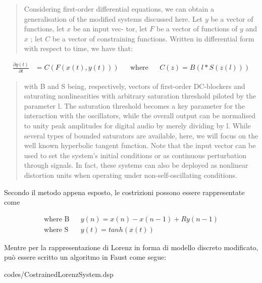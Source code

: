 \begin{quote}
    Considering first-order differential equations, 
    we can obtain a generalisation of the modified systems discussed
    here. Let \( y \) be a vector of functions, let \( x \) be an input vec-
    tor, let \( F \) be a vector of functions of \( y \) and \( x \) ; let  \( C \) be
    a vector of constraining functions. Written in differential
    form with respect to time, we have that:
\end{quote}
\begin{center}
\begin{align*}
    \frac{\partial y(t)}{\partial t} & = C(F(x(t), y(t))) && \text{where} && C(z) = B(l * S(z(l)))
\end{align*}
\end{center}
\begin{quote}
    with B and S being, respectively, vectors of first-order
    DC-blockers and saturating nonlinearities with arbitrary
    saturation threshold piloted by the parameter l. The saturation threshold 
    becomes a key parameter for the interaction with the oscillators, while the overall output can be
    normalised to unity peak amplitudes for digital audio by
    merely dividing by l. While several types of bounded saturators are available, here, 
    we will focus on the well known 
    hyperbolic tangent function. Note that the input
    vector can be used to set the system’s initial conditions or
    as continuous perturbation through signals. In fact, these
    systems can also be deployed as nonlinear distortion units
    when operating under non-self-oscillating conditions.
\end{quote}

Secondo il metodo appena esposto, le costrizioni possono essere rappresentate come

\begin{align*}
    \text{where B} && y(n) = x(n) -x(n-1) +Ry(n-1) \\
    \text{where S} && y(t) = tanh(x(t))
\end{align*}

Mentre per la rappresentazione di Lorenz in forma di modello discreto modificato,
può essere scritto un algoritmo in Faust come segue:

\vspace{0.5cm} 

{codes/CostrainedLorenzSystem.dsp}

